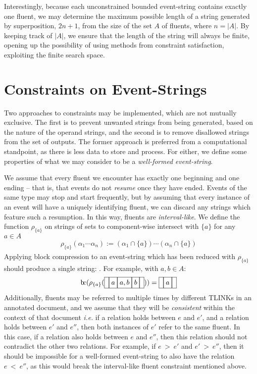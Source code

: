 \documentclass[a4paper,11pt,leqno]{article}
\makeatletter
\newcommand{\bc}{{\rm b\!c}}
\newcommand{\vph}[1]{\vphantom{#1}}
\newcommand{\ebox}[1]{\fbox{$\vph{',}#1$}}
\newcommand{\eboxb}[1]{\fbox{$\vph{@}#1$}}
\makeatother
\begin{document}
Interestingly, because each unconstrained bounded event-string 
\eboxb{}\eboxb{e}\eboxb{} contains exactly one fluent, we may determine the 
maximum possible length of a string generated by superposition, $2n + 1$, from 
the size of the set $A$ of fluents, where $n = |A|$. By keeping track of $|A|$, 
we ensure that the length of the string will always be finite, opening up the 
possibility of using methods from constraint satisfaction, exploiting the 
finite search space.

\section{Constraints on Event-Strings}\label{constraints}
Two approaches to constraints may be implemented, which are not mutually 
exclusive. The first is to prevent unwanted strings from being generated, based 
on the nature of the operand strings, and the second is to remove disallowed 
strings from the set of outputs. The former approach is preferred from a 
computational standpoint, as there is less data to store and process. For 
either, we define some properties of what we may consider to be a 
\textit{well-formed event-string}.

We assume that every fluent we encounter has exactly one beginning and one 
ending -- that is, that events do not \textit{resume} once they have ended. 
Events of the same type may stop and start frequently, but by assuming that 
every instance of an event will have a uniquely identifying fluent, we can 
discard any strings which feature such a resumption. In this way, fluents are 
\textit{interval-like}. We define the function 
$\rho_{\{a\}}$ on strings of sets to component-wise intersect with $\{a\}$ for 
any $a 
\in A$ \citep{fernando2016prior}
\begin{align}
\rho_{\{a\}}(\alpha_1 \cdots \alpha_n) := (\alpha_1 \cap \{a\}) \cdots 
(\alpha_n 
\cap 
\{a\})
\end{align}
Applying block compression to an event-string which has been reduced with 
$\rho_{\{a\}}$ should produce a single string: \eboxb{}\eboxb{a}\eboxb{}. For 
example, with $a, b \in A$:
\begin{align}
\bc{}(\rho_{\{a\}}(\ebox{}\ebox{a}\ebox{a, b}\ebox{b}\ebox{})) = 
\ebox{}\ebox{a}\ebox{}
\end{align}
Additionally, fluents may be referred to multiple times by different TLINKs in 
an annotated document, and we assume that they will be \textit{consistent} 
within the context of that document \textit{i.e.} if a relation holds between 
$e$ and $e'$, and a relation holds between $e'$ and $e''$, then both instances 
of $e'$ refer to the same fluent. In this case, if a relation also holds 
between $e$ and $e''$, then this relation should not contradict the other two 
relations. For example, if $e~>~e'$ and $e'~>~e''$, then it should be 
impossible for a well-formed event-string to also have the relation $e~<~e''$, 
as this would break the interval-like fluent constraint mentioned above.
\end{document}
